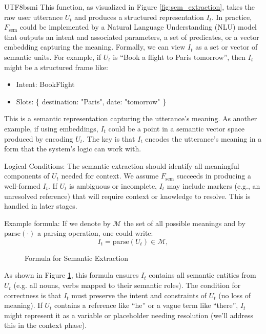 \documentclass{article}
\begin{document}
\begin{CJK*}{UTF8}{bsmi}
This function, as visualized in Figure \ref{fig:sem_extraction}, takes the raw user utterance $U_t$ and produces a structured representation $I_t$. In practice, $F_{\text{sem}}$ could be implemented by a Natural Language Understanding (NLU) model that outputs an intent and associated parameters, a set of predicates, or a vector embedding capturing the meaning. Formally, we can view $I_t$ as a set or vector of semantic units. For example, if $U_t$ is “Book a flight to Paris tomorrow”, then $I_t$ might be a structured frame like:
\begin{itemize}[label=●]
    \item Intent: BookFlight
    \item Slots: \{ destination: "Paris", date: "tomorrow" \}
\end{itemize}

This is a semantic representation capturing the utterance’s meaning. As another example, if using embeddings, $I_t$ could be a point in a semantic vector space produced by encoding $U_t$. The key is that $I_t$ encodes the utterance’s meaning in a form that the system’s logic can work with.

Logical Conditions: The semantic extraction should identify all meaningful components of $U_t$ needed for context. We assume $F_{\text{sem}}$ succeeds in producing a well-formed $I_t$. If $U_t$ is ambiguous or incomplete, $I_t$ may include markers (e.g., an unresolved reference) that will require context or knowledge to resolve. This is handled in later stages.

Example formula: If we denote by $\mathcal{M}$ the set of all possible meanings and by $\text{parse}(\cdot)$ a parsing operation, one could write:
\[
I_t = \text{parse}(U_t) \in \mathcal{M},
\]
\begin{figure}[htbp] %
    \centering
    \caption{Formula for Semantic Extraction}
    \label{fig:formula_it}
\end{figure}
As shown in Figure \ref{fig:formula_it}, this formula ensures $I_t$ contains all semantic entities from $U_t$ (e.g. all nouns, verbs mapped to their semantic roles). The condition for correctness is that $I_t$ must preserve the intent and constraints of $U_t$ (no loss of meaning). If $U_t$ contains a reference like “he” or a vague term like “there”, $I_t$ might represent it as a variable or placeholder needing resolution (we’ll address this in the context phase).


\end{CJK*}
\end{document}

